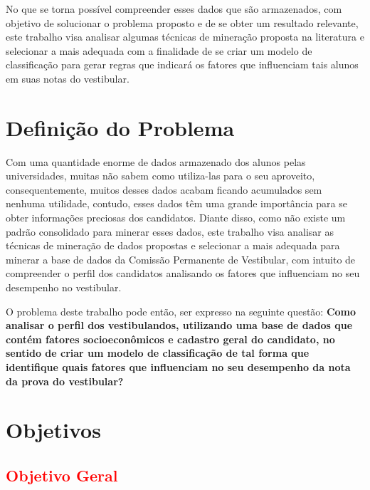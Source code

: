 No que se torna possível compreender esses dados que são armazenados, com objetivo de solucionar o problema proposto e de se obter um resultado relevante, este trabalho visa analisar algumas técnicas de mineração proposta na literatura e selecionar a mais adequada com a finalidade de se criar um modelo de classificação para gerar regras que indicará os fatores que influenciam tais alunos em suas notas do vestibular.


\section{Definição do Problema}

\par
Com uma quantidade enorme de dados armazenado dos alunos pelas universidades, muitas não sabem como utiliza-las para o seu aproveito, consequentemente, muitos desses dados acabam ficando acumulados sem nenhuma utilidade, contudo, esses dados têm uma grande importância para se obter informações preciosas dos candidatos. Diante disso, como não existe um padrão consolidado para minerar esses dados, este trabalho visa analisar as técnicas de mineração de dados propostas e selecionar a mais adequada para minerar a base de dados da Comissão Permanente de Vestibular, com intuito de compreender o perfil dos candidatos analisando os fatores que influenciam no seu desempenho no vestibular.

\par
O problema deste trabalho pode então, ser expresso na seguinte questão: \textbf{Como analisar o perfil dos vestibulandos, utilizando uma base de dados que contém fatores socioeconômicos e cadastro geral do candidato, no sentido de criar um modelo de classificação de tal forma que identifique quais fatores que influenciam no seu desempenho da nota  da prova do vestibular? }



\section{Objetivos}

\subsection{\textcolor{red}{Objetivo Geral}}

